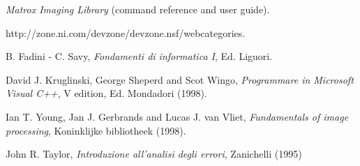 \begin{thebibliography}{99}
 \emph{Matrox Imaging Library} (command reference and user guide).

 http://zone.ni.com/devzone/devzone.nsf/webcategories.

 B. Fadini - C. Savy, \emph{Fondamenti di informatica I}, Ed. Liguori.

 David J. Kruglinski, George Sheperd and Scot Wingo, \emph{Programmare in Microsoft Visual C++}, V edition, Ed. Mondadori (1998).

 Ian T. Young, Jan J. Gerbrands and Lucas J. van Vliet, \emph{Fundamentals of image processing}, Koninklijke bibliotheek (1998).



 John R. Taylor, \emph{Introduzione all'analisi degli errori}, Zanichelli (1995)

\end{thebibliography}



